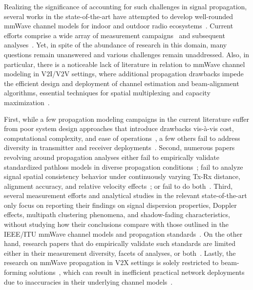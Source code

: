 \documentclass[12pt, draftcls, onecolumn]{IEEEtran}
\begin{document}
Realizing the significance of accounting for such challenges in signal propagation, several works in the state-of-the-art have attempted to develop well-rounded mmWave channel models for indoor and outdoor radio ecosystems~\cite{NISTModeling, Outdoor28G, Indoor60G, QDC_NIST, D2DHumanBlockage}. Current efforts comprise a wide array of measurement campaigns~\cite{Purdue, Foliage, AgileLink, Harvard, Outdoor28G, PDAPs, MolischSpatialIndoorOutdoor, DopplerHST} and subsequent analyses~\cite{SuburbanGeometryJournal, FoliageSimulations, Indoor60G, Qualcomm3GPP, MacCartneyModelsOverview, SpatialConsistencyOriginal, MacCartneyRural, MolischEstimate}. Yet, in spite of the abundance of research in this domain, many questions remain unanswered and various challenges remain unaddressed. Also, in particular, there is a noticeable lack of literature in relation to mmWave channel modeling in V$2$I/V$2$V settings, where additional propagation drawbacks impede the efficient design and deployment of channel estimation and beam-alignment algorithms, essential techniques for spatial multiplexing and capacity maximization~\cite{VehicularBeamSelection, CVBeamAlignmentV2X}. 

First, while a few propagation modeling campaigns in the current literature suffer from poor system design approaches that introduce drawbacks vis-\`{a}-vis cost, computational complexity, and ease of operations~\cite{Purdue, Foliage, AgileLink}, a few others fail to address diversity in transmitter and receiver deployments~\cite{Harvard, Indoor60G, MacCartneyRural}. Second, numerous papers revolving around propagation analyses either fail to empirically validate standardized pathloss models in diverse propagation conditions~\cite{SpatialConsistencyOriginal, MolischSpatialOutdoor, MacCartneySpatialStatistics}; fail to analyze signal spatial consistency behavior under continuously varying Tx-Rx distance, alignment accuracy, and relative velocity effects~\cite{Outdoor28G, Qualcomm3GPP, MacCartneyModelsOverview}; or fail to do both~\cite{Indoor60G, SuburbanGeometryJournal, FoliageSimulations}. Third, several measurement efforts and analytical studies in the relevant state-of-the-art only focus on reporting their findings on signal dispersion properties, Doppler effects, multipath clustering phenomena, and shadow-fading characteristics, without studying how their conclusions compare with those outlined in the IEEE/ITU mmWave channel models and propagation standards~\cite{PDAPs, DopplerHST, Outdoor28G, SpatialDynamics, V2XBlockages}. On the other hand, research papers that do empirically validate such standards are limited either in their measurement diversity, facets of analyses, or both~\cite{Indoor60G, NISTModeling, QDC_NIST, D2DHumanBlockage}. Lastly, the research on mmWave propagation in V$2$X settings is solely restricted to beam-forming solutions~\cite{VehicularBeamSelection, CVBeamAlignmentV2X}, which can result in inefficient practical network deployments due to inaccuracies in their underlying channel models~\cite{MolischEstimate, IoV}.
\end{document}
